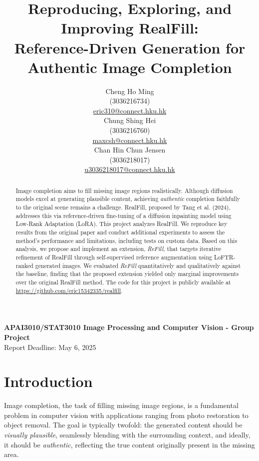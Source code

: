 \documentclass{article}
\title{Reproducing, Exploring, and Improving RealFill: \\ Reference-Driven Generation for Authentic Image Completion}
\author{%
  Cheng Ho Ming \\
  \small{(3036216734)} \\
  \url{eric310@connect.hku.hk} \\
  \And %
  Chung Shing Hei \\
  \small{(3036216760)} \\
  \url{maxcsh@connect.hku.hk} \\
  \AND %
  Chan Hin Chun Jensen \\
  \small{(3036218017)} \\
  \url{u3036218017@connect.hku.hk} \\
}
\begin{document}
\maketitle

\begin{center}
    \textbf{APAI3010/STAT3010 Image Processing and Computer Vision - Group Project} \\
    Report Deadline: May 6, 2025
\end{center}
\vspace{1.5em} %

\begin{abstract}
    Image completion aims to fill missing image regions realistically. Although diffusion models excel at generating plausible content, achieving \emph{authentic} completion faithfully to the original scene remains a challenge. RealFill, proposed by Tang et al. (2024), addresses this via reference-driven fine-tuning of a diffusion inpainting model using Low-Rank Adaptation (LoRA). This project analyzes RealFill. We reproduce key results from the original paper and conduct additional experiments to assess the method's performance and limitations, including tests on custom data. Based on this analysis, we propose and implement an extension, \emph{ReFill}, that targets iterative refinement of RealFill through self-supervised reference augmentation using LoFTR-ranked generated images. We evaluated \emph{ReFill} quantitatively and qualitatively against the baseline, finding that the proposed extension yielded only marginal improvements over the original RealFill method. The code for this project is publicly available at \url{https://github.com/eric15342335/realfill}.
\end{abstract}


\section{Introduction}
\label{sec:introduction}
Image completion, the task of filling missing image regions, is a fundamental problem in computer vision with applications ranging from photo restoration to object removal. The goal is typically twofold: the generated content should be \emph{visually plausible}, seamlessly blending with the surrounding context, and ideally, it should be \emph{authentic}, reflecting the true content originally present in the missing area.
\end{document}
